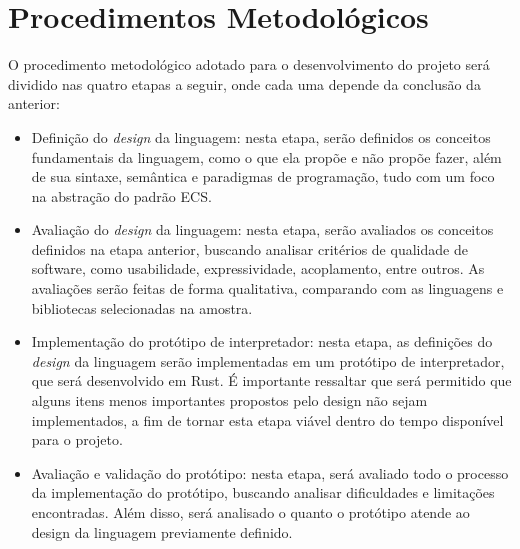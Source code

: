 \section{Procedimentos Metodológicos}

O procedimento metodológico adotado para o desenvolvimento do projeto será dividido nas quatro etapas a seguir, onde cada uma depende da conclusão da anterior:

\begin{itemize}
    \item Definição do \textit{design} da linguagem: nesta etapa, serão definidos os conceitos fundamentais da linguagem, como o que ela propõe e não propõe fazer, além de sua sintaxe, semântica e paradigmas de programação, tudo com um foco na abstração do padrão ECS.
    \item Avaliação do \textit{design} da linguagem: nesta etapa, serão avaliados os conceitos definidos na etapa anterior, buscando analisar critérios de qualidade de software, como usabilidade, expressividade, acoplamento, entre outros. As avaliações serão feitas de forma qualitativa, comparando com as linguagens e bibliotecas selecionadas na amostra.
    \item Implementação do protótipo de interpretador: nesta etapa, as definições do \textit{design} da linguagem serão implementadas em um protótipo de interpretador, que será desenvolvido em Rust. É importante ressaltar que será permitido que alguns itens menos importantes propostos pelo design não sejam implementados, a fim de tornar esta etapa viável dentro do tempo disponível para o projeto.
    \item Avaliação e validação do protótipo: nesta etapa, será avaliado todo o processo da implementação do protótipo, buscando analisar dificuldades e limitações encontradas. Além disso, será analisado o quanto o protótipo atende ao design da linguagem previamente definido.
\end{itemize}
